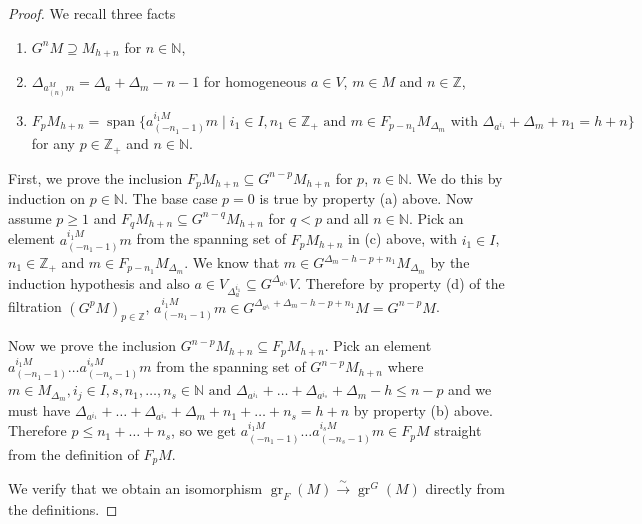 \documentclass[12pt, a4paper]{article}
\theoremstyle{remark}
\DeclareMathOperator{\gr}{gr}
\DeclareMathOperator{\vspan}{span}
\begin{document}
\begin{proof}
  We recall three facts
  \begin{enumerate}[label={(\alph*)}]
  \item $G^nM \supseteq M_{h + n}$ for $n \in \mathbb{N}$,
  \item $\Delta_{a^M_{(n)}m} = \Delta_a + \Delta_m - n - 1$ for homogeneous $a \in V$, $m \in M$ and $n \in \mathbb{Z}$,
  \item $F_pM_{h + n} = \vspan\{a^{i_1M}_{(-n_1 - 1)}m \mid i_1 \in I, n_1 \in \mathbb{Z}_+\text{ and } m \in F_{p - n_1}M_{\Delta_m}\text{ with }\Delta_{a^{i_1}} + \Delta_m + n_1 = h + n\}$ for any $p \in \mathbb{Z}_+$ and $n \in \mathbb{N}$.
  \end{enumerate}
  First, we prove the inclusion $F_pM_{h + n} \subseteq G^{n - p}M_{h + n}$ for $p$, $n \in \mathbb{N}$.
  We do this by induction on $p \in \mathbb{N}$.
  The base case $p = 0$ is true by property (a) above.
  Now assume $p \ge 1$ and $F_qM_{h + n} \subseteq G^{n - q}M_{h + n}$ for $q < p$ and all $n \in \mathbb{N}$.
  Pick an element $a^{i_1M}_{(-n_1 - 1)}m$ from the spanning set of $F_pM_{h + n}$ in (c) above, with $i_1 \in I$, $n_1 \in \mathbb{Z}_+$ and $m \in F_{p - n_1}M_{\Delta_m}$.
  We know that $m \in G^{\Delta_m - h - p + n_1}M_{\Delta_m}$ by the induction hypothesis and also $a \in V_{\Delta_a^{i_1}} \subseteq G^{\Delta_{a^{i_1}}}V$.
  Therefore by property (d) of the filtration $(G^pM)_{p \in \mathbb{Z}}$, $a^{i_1M}_{(-n_1 - 1)}m \in G^{\Delta_{a^{i_1}} + \Delta_m - h - p + n_1}M = G^{n - p}M$.

  Now we prove the inclusion $G^{n - p}M_{h + n} \subseteq F_pM_{h + n}$.
  Pick an element $a^{i_1M}_{(-n_1 - 1)}\dots a^{i_sM}_{(-n_s - 1)}m$ from the spanning set of $G^{n - p}M_{h + n}$ where $m \in M_{\Delta_m}, i_j \in I, s, n_1, \dots, n_s\in \mathbb{N}\text{ and }\Delta_{a^{i_1}} + \dots + \Delta_{a^{i_s}} + \Delta_m - h \le n - p$ and we must have $\Delta_{a^{i_1}} + \dots + \Delta_{a^{i_s}} + \Delta_m + n_1 + \dots + n_s = h + n$ by property (b) above.
  Therefore $p \le n_1 + \dots + n_s$, so we get $a^{i_1M}_{(-n_1 - 1)}\dots a^{i_sM}_{(-n_s - 1)}m \in F_pM$ straight from the definition of $F_pM$.

  We verify that we obtain an isomorphism $\gr_F(M) \xrightarrow{\sim} \gr^G(M)$ directly from the definitions.
\end{proof}
\end{document}
